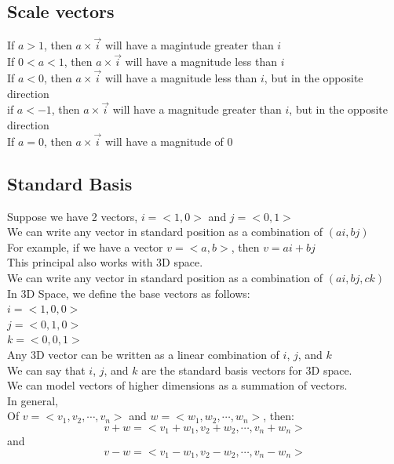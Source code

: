\documentclass[]{article}
\begin{document}
    \subsection*{Scale vectors}
    If $a > 1$, then $a \times \overrightarrow{i}$ will have a magintude greater than $i$\\
    If $0 < a < 1$, then $a \times \overrightarrow{i}$ will have a magnitude less than $i$\\
    If $a < 0$, then $a \times \overrightarrow{i}$ will have a magnitude less than $i$, but in the opposite direction\\
    if $a < -1$, then $a \times \overrightarrow{i}$ will have a magnitude greater than $i$, but in the opposite direction\\
    If $a = 0$, then $a \times \overrightarrow{i}$ will have a magnitude of 0\\

    \subsection*{Standard Basis}
    Suppose we have 2 vectors, $i = <1, 0>$ and $j = <0, 1>$\\
    We can write any vector in standard position as a combination of $(ai, bj)$\\
    For example, if we have a vector $v = <a, b>$, then $v = ai + bj$\\

    This principal also works with 3D space.\\
    We can write any vector in standard position as a combination of $(ai, bj, ck)$\\
    In 3D Space, we define the base vectors as follows:\\
    $i = <1, 0, 0>$\\
    $j = <0, 1, 0>$\\
    $k = <0, 0, 1>$\\

    Any 3D vector can be written as a linear combination of $i$, $j$, and $k$\\
    We can say that $i$, $j$, and $k$ are the standard basis vectors for 3D space.\\

    
    We can model vectors of higher dimensions as a summation of vectors.\\
    In general,\\
    \quad Of $v = <v_1, v_2, \cdots, v_n>$ and $w = <w_1, w_2, \cdots, w_n>$, then:
    \begin{equation}
        v + w = <v_1 + w_1, v_2 + w_2, \cdots, v_n + w_n>
    \end{equation}
    and
    \begin{equation}
        v-w = <v_1 - w_1, v_2 - w_2, \cdots, v_n - w_n>
    \end{equation}
\end{document}
